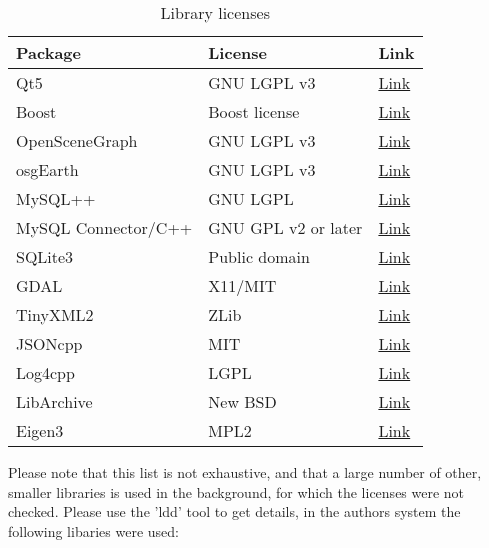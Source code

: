 \begin{table}[H]
  \center
  \begin{tabular}{ | l | l | l |}
    \hline
    \textbf{Package} & \textbf{License} & \textbf{Link} \\ \hline
    Qt5 & GNU LGPL v3 &\href{https://doc.qt.io/qt-5.10/licensing.html}{Link} \\ \hline
    Boost & Boost license  & \href{https://www.boost.org/users/license.html}{Link} \\ \hline
    OpenSceneGraph & GNU LGPL v3 &\href{http://www.openscenegraph.org/index.php/about/licensing}{Link} \\ \hline
    osgEarth & GNU LGPL v3 &\href{hhttps://github.com/gwaldron/osgearth/blob/master/LICENSE.txt}{Link} \\ \hline    
    MySQL++ & GNU LGPL & \href{https://tangentsoft.com/mysqlpp/wiki?name=FAQ}{Link} \\ \hline
    MySQL Connector/C++ & GNU GPL v2 or later & \href{https://downloads.mysql.com/docs/licenses/connector-cpp-gpl-en.pdf}{Link} \\ \hline
    SQLite3 & Public domain & \href{https://www.sqlite.org/copyright.html}{Link} \\ \hline
    GDAL & X11/MIT & \href{https://trac.osgeo.org/gdal/wiki/FAQGeneral#WhatlicensedoesGDALOGRuse}{Link} \\ \hline
    TinyXML2 & ZLib & \href{http://leethomason.github.io/tinyxml2/}{Link} \\ \hline
    JSONcpp & MIT & \href{https://github.com/open-source-parsers/jsoncpp/blob/master/LICENSE}{Link} \\ \hline    
    Log4cpp & LGPL & \href{http://log4cpp.sourceforge.net/#license}{Link} \\ \hline
    LibArchive & New BSD & \href{https://raw.githubusercontent.com/libarchive/libarchive/master/COPYING}{Link} \\ \hline
    Eigen3 & MPL2 & \href{http://eigen.tuxfamily.org/index.php?title=Main_Page}{Link} \\
    \hline
  \end{tabular}
  \caption{Library licenses}
\end{table}

Please note that this list is not exhaustive, and that a large number of other, smaller libraries is used in the background, for which the licenses were not checked. Please use the 'ldd' tool to get details, in the authors system the following libaries were used:

